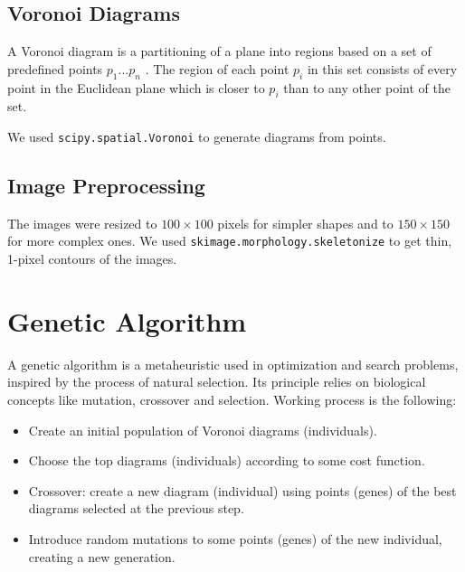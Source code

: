 \documentclass[a1,portrait]{a0poster}
\begin{document}
\begin{multicols}{2}
\subsection*{Voronoi Diagrams}

A Voronoi diagram is a partitioning of a plane into regions based on a set of predefined points ${p_1 ... p_n}$ . The region of each point $p_i$ in this set
consists of every point in the Euclidean plane which is closer to $p_i$ than to any other point of the set.

We used \texttt{scipy.spatial.Voronoi} to generate diagrams from points.

\subsection*{Image Preprocessing}
The images were resized to $100\times100$ pixels for simpler shapes and to $150\times150$
for more complex ones. We used \texttt{skimage.morphology.skeletonize} to get thin,
1-pixel contours of the images.



\section*{Genetic Algorithm}

A genetic algorithm is a metaheuristic used in optimization and search problems, inspired by the process of natural selection. Its principle relies
on biological concepts like mutation, crossover and selection. Working process is the following:



\begin{itemize}
	\item Create an initial population of Voronoi diagrams (individuals).
	\item Choose the top diagrams (individuals) according to some cost function.
	\item Crossover: create a new diagram (individual) using points (genes) of the best diagrams
	selected at the previous step.
	\item Introduce random mutations to some points (genes) of the new individual,
	creating a new generation.
\end{itemize}


\end{multicols}
\end{document}
